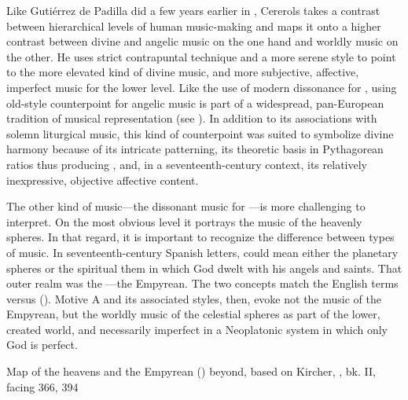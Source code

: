 Like Gutiérrez de Padilla did a few years earlier in , Cererols takes a contrast between hierarchical levels of human
music-making and maps it onto a higher contrast between divine and angelic music
on the one hand and worldly music on the other.
He uses strict contrapuntal technique and a more serene style to point to the
more elevated kind of divine music, and more subjective, affective,
imperfect music for the lower level.
Like the use of modern dissonance for , using old-style
counterpoint for angelic music is part of a widespread, pan-European tradition
of musical representation (see ).
In addition to its associations with solemn liturgical music, this kind of
counterpoint was suited to symbolize divine harmony because of its intricate
patterning, its theoretic basis in Pythagorean ratios thus producing
, and, in a seventeenth-century context, its relatively
inexpressive, objective affective content.


The other kind of music---the dissonant music for ---is more challenging to interpret.
On the most obvious level it portrays the music of the heavenly spheres.
In that regard, it is important to recognize the difference between types of
 music.
In seventeenth-century Spanish letters,  could mean either the
planetary spheres or the spiritual  them in which God dwelt
with his angels and saints.
That outer realm was the ---the Empyrean.
The two concepts match the English terms  versus
 ().
Motive A and its associated styles, then, evoke not the music of the Empyrean,
but the worldly music of the celestial spheres as part of the lower, created
world, and necessarily imperfect in a Neoplatonic system in which only God is
perfect.


{Map of the heavens and the Empyrean () beyond, based on
Kircher, , bk. II, facing 366, 394}

